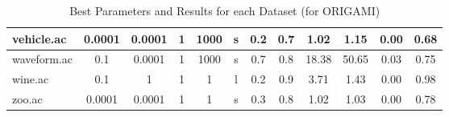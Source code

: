 \begin{table}[htbp]
\begin{tabular}{|l|c|c|c|c|c|c|c||c|c|c|c|}
		\hline
		vehicle.ac     & 0.0001   & 0.0001      & 1              & 1000                & s        & 0.2    & 0.7   & 1.02           & 1.15           & 0.00           & 0.68           \\
		\hline
		waveform.ac    & 0.1      & 0.0001      & 1              & 1000                & s        & 0.7    & 0.8   & 18.38          & 50.65          & 0.03           & 0.75           \\
		\hline
		wine.ac        & 0.1      & 1           & 1              & 1                   & l        & 0.2    & 0.9   & 3.71           & 1.43           & 0.00           & 0.98           \\
		\hline
		zoo.ac         & 0.0001   & 0.0001      & 1              & 1                   & s        & 0.3    & 0.8   & 1.02           & 1.03           & 0.00           & 0.78           \\
		\hline
		\end{tabular}
	\caption{Best Parameters and Results for each Dataset (for ORIGAMI)}
	\label{tab:best_runs_for_each_db_origami_uc}
\end{table}